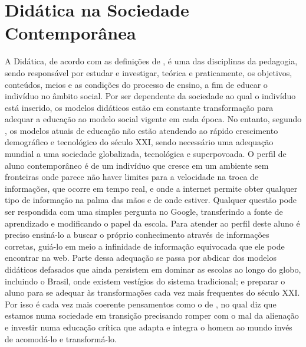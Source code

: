 \section{Didática na Sociedade Contemporânea}\label{sec:didatica_sociedade_cont}
A Didática, de acordo com as definições de \cite{libaneo}, é uma das disciplinas da pedagogia, sendo responsável por estudar e investigar, teórica e praticamente, os objetivos, conteúdos, meios e as condições do processo de ensino, a fim de educar o indivíduo no âmbito social. Por ser dependente da sociedade ao qual o indivíduo está inserido, os modelos didáticos estão em constante transformação para adequar a educação ao modelo social vigente em cada época. No entanto, segundo \cite{al-mufti}, os modelos atuais de educação não estão atendendo ao rápido crescimento demográfico e tecnológico do século XXI, sendo necessário uma adequação mundial a uma sociedade globalizada, tecnológica e superpovoada. O perfil de aluno contemporâneo é de um indivíduo que cresce em um ambiente sem fronteiras onde parece não haver limites para a velocidade na troca de informações, que ocorre em tempo real, e onde a internet  permite obter qualquer tipo de informação na palma das mãos e de onde estiver. Qualquer questão pode ser respondida com uma simples pergunta no Google, transferindo a fonte de aprendizado e modificando o papel da escola. Para atender ao perfil deste aluno é preciso ensiná-lo a buscar o próprio conhecimento através de informações corretas, guiá-lo em meio a infinidade de informação equivocada que ele pode encontrar na web. Parte dessa adequação se passa por abdicar dos modelos didáticos defasados que ainda persistem em dominar as escolas ao longo do globo, incluindo o Brasil, onde existem vestígios do sistema tradicional; e preparar o aluno para se adequar às transformações cada vez mais frequentes do século XXI. Por isso é cada vez mais coerente pensamentos como o de \cite{freire}, no qual diz que estamos numa sociedade em transição precisando romper com o mal da alienação e investir numa educação crítica que adapta e integra o homem ao mundo invés de acomodá-lo e transformá-lo. 

